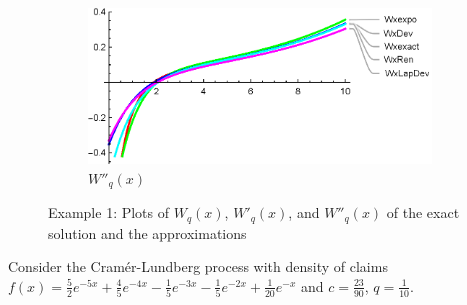\begin{figure}
    ~ %
    \\
    \begin{subfigure}[b]{0.9\textwidth}
        \includegraphics[width=\textwidth]{W2sample1}
        \caption{$W''_q(x)$}
        \label{fig:W2sample1}
    \end{subfigure}
    \caption{Example 1: Plots of $W_q(x)$, $W'_q(x)$, and $W''_q(x)$ of the exact solution and the approximations}\label{fig:sample1}
\end{figure}

\eeXa


\beXa {}
Consider the Cram\'{e}r-Lundberg process with density of claims $f(x)=\frac{5}{2 }e^{-5x}+\frac{4}{5} e^{-4 x}-\frac{1}{5}e^{-3x}- \frac{1}{5}e^{-2x}+ \frac{1}{20}e^{-x}$
and $c=\frac{23}{90}$,   $q=\frac{1}{10}$.

